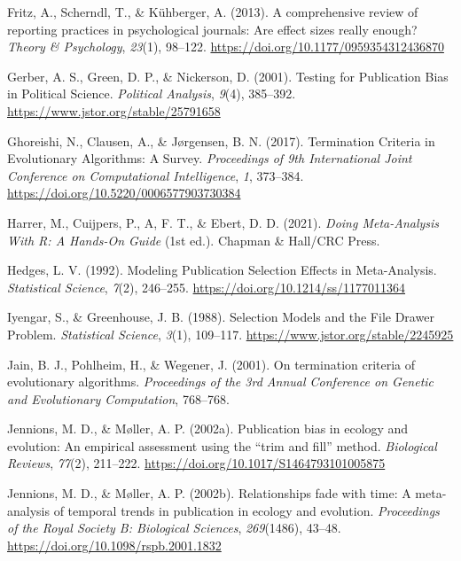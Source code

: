 \documentclass[
  12pt,
]{scrartcl}
\newlength{\cslhangindent}
\newenvironment{CSLReferences}[2] %
 {\begin{list}{}{%
  \setlength{\itemindent}{0pt}
  \setlength{\leftmargin}{0pt}
  \setlength{\parsep}{0pt}
  \ifodd #1
   \setlength{\leftmargin}{\cslhangindent}
   \setlength{\itemindent}{-1\cslhangindent}
  \fi
  \setlength{\itemsep}{#2\baselineskip}}}
 {\end{list}}
\begin{document}
\begin{CSLReferences}{1}{0}
Fritz, A., Scherndl, T., \& Kühberger, A. (2013). A comprehensive review
of reporting practices in psychological journals: {Are} effect sizes
really enough? \emph{Theory \& Psychology}, \emph{23}(1), 98--122.
\url{https://doi.org/10.1177/0959354312436870}

Gerber, A. S., Green, D. P., \& Nickerson, D. (2001). Testing for
{Publication} {Bias} in {Political} {Science}. \emph{Political
Analysis}, \emph{9}(4), 385--392.
\url{https://www.jstor.org/stable/25791658}

Ghoreishi, N., Clausen, A., \& Jørgensen, B. N. (2017). Termination
{Criteria} in {Evolutionary} {Algorithms}: {A} {Survey}.
\emph{Proceedings of 9th {International} {Joint} {Conference} on
{Computational} {Intelligence}}, \emph{1}, 373--384.
\url{https://doi.org/10.5220/0006577903730384}

Harrer, M., Cuijpers, P., A, F. T., \& Ebert, D. D. (2021). \emph{Doing
{Meta}-{Analysis} {With} {R}: {A} {Hands}-{On} {Guide}} (1st ed.).
Chapman \& Hall/CRC Press.

Hedges, L. V. (1992). Modeling {Publication} {Selection} {Effects} in
{Meta}-{Analysis}. \emph{Statistical Science}, \emph{7}(2), 246--255.
\url{https://doi.org/10.1214/ss/1177011364}

Iyengar, S., \& Greenhouse, J. B. (1988). Selection {Models} and the
{File} {Drawer} {Problem}. \emph{Statistical Science}, \emph{3}(1),
109--117. \url{https://www.jstor.org/stable/2245925}

Jain, B. J., Pohlheim, H., \& Wegener, J. (2001). On termination
criteria of evolutionary algorithms. \emph{Proceedings of the 3rd
{Annual} {Conference} on {Genetic} and {Evolutionary} {Computation}},
768--768.

Jennions, M. D., \& Møller, A. P. (2002a). Publication bias in ecology
and evolution: An empirical assessment using the {``trim and fill''}
method. \emph{Biological Reviews}, \emph{77}(2), 211--222.
\url{https://doi.org/10.1017/S1464793101005875}

Jennions, M. D., \& Møller, A. P. (2002b). Relationships fade with time:
A meta-analysis of temporal trends in publication in ecology and
evolution. \emph{Proceedings of the Royal Society B: Biological
Sciences}, \emph{269}(1486), 43--48.
\url{https://doi.org/10.1098/rspb.2001.1832}


\end{CSLReferences}
\end{document}
